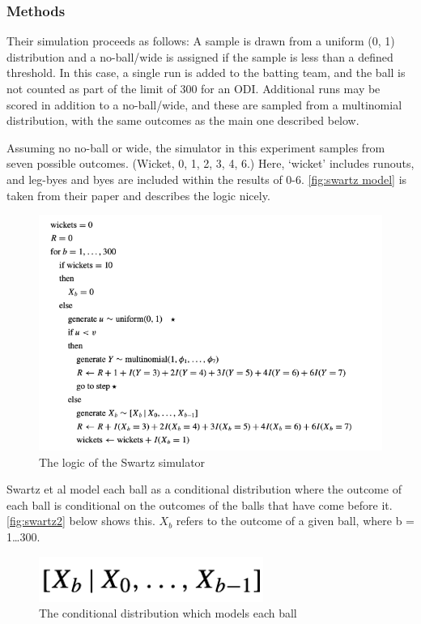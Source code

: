 \subsubsection{Methods}

Their simulation proceeds as follows:
A sample is drawn from a uniform (0, 1) distribution and a no-ball/wide is assigned if the sample is less than a defined threshold. In this case, a single run is added to the batting team, and the ball is not counted as part of the limit of 300 for an ODI. Additional runs may be scored in addition to a no-ball/wide, and these are sampled from a multinomial distribution, with the same outcomes as the main one described below.

Assuming no no-ball or wide, the simulator in this experiment samples from seven possible outcomes. (Wicket, 0, 1, 2, 3, 4, 6.) Here, ‘wicket’ includes runouts, and leg-byes and byes are included within the results of 0-6. \autoref{fig:swartz model} is taken from their paper and describes the logic nicely.

\begin{figure}[h]
    \centering
    \includegraphics{images/swartz.png}
    \caption{The logic of the Swartz simulator}
    \label{fig:swartz model}
\end{figure}

Swartz et al model each ball as a conditional distribution where the outcome of each ball is conditional on the outcomes of the balls that have come before it. \autoref{fig:swartz2} below shows this. $X_{b}$ refers to the outcome of a given ball, where b = 1…300.

\begin{figure}
    \centering
    \includegraphics{images/swartz2.png}
    \caption{The conditional distribution which models each ball}
    \label{fig:swartz2}
\end{figure}

